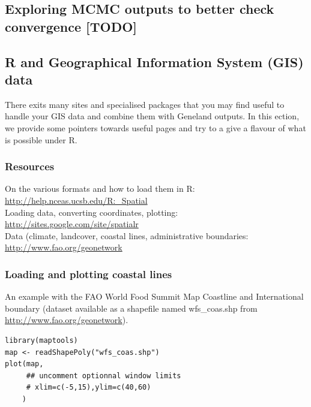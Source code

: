 \documentclass[a4paper,10pt]{article}
\begin{document}
\subsection[Convergence checking]{Exploring MCMC outputs to better check convergence  [TODO]}





\subsection[Displaying GIS data]{R and Geographical Information System (GIS) data}

There exits many sites and specialised packages that you may find useful to handle your GIS data and combine them 
with {\sc Geneland} outputs. In this ection, we provide some pointers towards useful pages 
and try to a give a flavour of what is possible under R.


\subsubsection{Resources}

On the various formats and how to load them in R: \url{http://help.nceas.ucsb.edu/R:_Spatial}\\

Loading data, converting coordinates, plotting: \url{http://sites.google.com/site/spatialr}\\

Data (climate, landcover, coastal lines, administrative boundaries: \url{http://www.fao.org/geonetwork}\\


\subsubsection{Loading and plotting coastal lines}

An example with the FAO World Food Summit Map Coastline and International boundary (dataset available as a shapefile 
named wfs\_coas.shp from \url{http://www.fao.org/geonetwork}).

\medskip

\begin{verbatim}
library(maptools)
map <- readShapePoly("wfs_coas.shp")
plot(map,
     ## uncomment optionnal window limits
     # xlim=c(-5,15),ylim=c(40,60)
    )
\end{verbatim}
\end{document}
